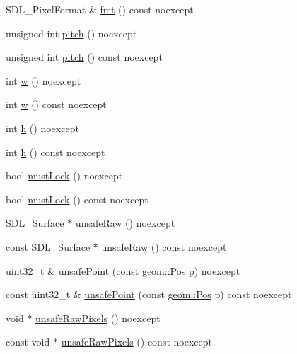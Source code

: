 \begin{DoxyCompactItemize}
\item 
S\+D\+L\+\_\+\+Pixel\+Format \& \mbox{\hyperlink{classrolmodl_1_1_s_w_tex___base_ac8021c7296e412b61f86e86465692213}{fmt}} () const noexcept
\item 
unsigned int \mbox{\hyperlink{classrolmodl_1_1_s_w_tex___base_a029e49ecd18d8f518d0f5fe3550c8873}{pitch}} () noexcept
\item 
unsigned int \mbox{\hyperlink{classrolmodl_1_1_s_w_tex___base_aa59f8fa61de6ed292e1eaea6730939c2}{pitch}} () const noexcept
\item 
int \mbox{\hyperlink{classrolmodl_1_1_s_w_tex___base_ad38dfbf23e9df3be982bccadb6fd35c4}{w}} () noexcept
\item 
int \mbox{\hyperlink{classrolmodl_1_1_s_w_tex___base_adecbad428b1e1c911299f5af3c5d4593}{w}} () const noexcept
\item 
int \mbox{\hyperlink{classrolmodl_1_1_s_w_tex___base_a7672866450cb7dc115412e8b19f5ff47}{h}} () noexcept
\item 
int \mbox{\hyperlink{classrolmodl_1_1_s_w_tex___base_a84ceb6896b2428fc673786c2f6b69b8f}{h}} () const noexcept
\item 
bool \mbox{\hyperlink{classrolmodl_1_1_s_w_tex___base_a689ae688bc8227f8c49812f66d9a43ae}{must\+Lock}} () noexcept
\item 
bool \mbox{\hyperlink{classrolmodl_1_1_s_w_tex___base_a422aec7c65ce9c29d1aad4b111abb34a}{must\+Lock}} () const noexcept
\item 
S\+D\+L\+\_\+\+Surface $\ast$ \mbox{\hyperlink{classrolmodl_1_1_s_w_tex___base_a8ecdb8f5e18f854e1754dad6b2834d47}{unsafe\+Raw}} () noexcept
\item 
const S\+D\+L\+\_\+\+Surface $\ast$ \mbox{\hyperlink{classrolmodl_1_1_s_w_tex___base_a7c98bfe29be0c8cd4160ca88db8da00a}{unsafe\+Raw}} () const noexcept
\item 
uint32\+\_\+t \& \mbox{\hyperlink{classrolmodl_1_1_s_w_tex___base_ad506dc816121f170d877fd9ad04ec75b}{unsafe\+Point}} (const \mbox{\hyperlink{structrolmodl_1_1geom_1_1_pos}{geom\+::\+Pos}} p) noexcept
\item 
const uint32\+\_\+t \& \mbox{\hyperlink{classrolmodl_1_1_s_w_tex___base_a6e7f7d6235f3327dc899d6e2e6ad390b}{unsafe\+Point}} (const \mbox{\hyperlink{structrolmodl_1_1geom_1_1_pos}{geom\+::\+Pos}} p) const noexcept
\item 
void $\ast$ \mbox{\hyperlink{classrolmodl_1_1_s_w_tex___base_ab4e29b063221ee6f8e5fa53e4f073a36}{unsafe\+Raw\+Pixels}} () noexcept
\item 
const void $\ast$ \mbox{\hyperlink{classrolmodl_1_1_s_w_tex___base_a9f82650e1aa4d57a7537f07d1ba03692}{unsafe\+Raw\+Pixels}} () const noexcept
\end{DoxyCompactItemize}
